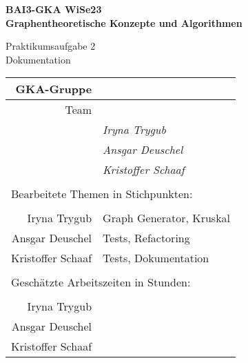 

\thispagestyle{empty}
\begin{center}

    {\large {\bf   BAI3-GKA WiSe23 \\ Graphentheoretische Konzepte und Algorithmen \\[5mm]} }
    
{\huge Praktikumsaufgabe 2  \\[5mm] Dokumentation}\\

\end{center}

				\begin{tabular}[t]{|r|l|}
				 \hline
				GKA-Gruppe&                 \raisebox{-3mm}{\rule[8mm]{100mm}{0mm} }\\ \hline    
				Team &                                                        \\ \hline			
				& \textit{Iryna Trygub }               \\ \hline    
				& \textit{Ansgar Deuschel }               \\ \hline			
				& \textit{Kristoffer Schaaf }             \\ \hline  			
				\multicolumn{2}{c}{}\\  			
				\multicolumn{2}{l}{Bearbeitete Themen in Stichpunkten:}\\			
				\multicolumn{2}{c}{}\\  \hline
				Iryna Trygub & Graph Generator, Kruskal             \\ \hline    
				Ansgar Deuschel & Tests, Refactoring                \\ \hline			
				Kristoffer Schaaf & Tests, Dokumentation            \\ \hline 		
				\multicolumn{2}{c}{}\\  			
				\multicolumn{2}{l}{Geschätzte Arbeitszeiten in Stunden:}\\			
				\multicolumn{2}{c}{}\\  \hline
				Iryna Trygub &               \\ \hline    
				Ansgar Deuschel &                \\ \hline			
				Kristoffer Schaaf &               \\ \hline 			
				\end{tabular}
~\\[4mm]
		
		
\vfill


